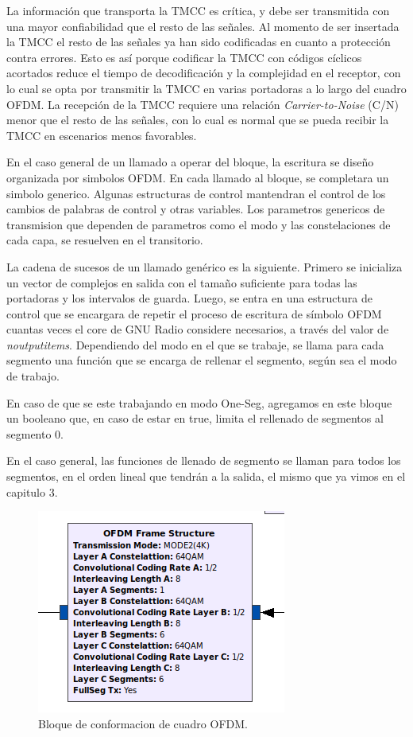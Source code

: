 La información que transporta la TMCC es crítica, y debe ser transmitida con una mayor confiabilidad que el resto de las señales. Al momento de ser insertada la TMCC el resto de las señales ya han sido codificadas en cuanto a protección contra errores. Esto es así porque codificar la TMCC con códigos cíclicos acortados reduce el tiempo de decodificación y la complejidad en el receptor, con lo cual se opta por transmitir la TMCC en varias portadoras a lo largo del cuadro OFDM. La recepción de la TMCC requiere una relación \textit{Carrier-to-Noise} (C/N) menor que el resto de las señales, con lo cual es normal que se pueda recibir la TMCC en escenarios menos favorables.

En el caso general de un llamado a operar del bloque, la escritura se diseño organizada por simbolos OFDM. En cada llamado al bloque, se completara un simbolo generico. Algunas estructuras de control mantendran el control de los cambios de palabras de control y otras variables. Los parametros genericos de transmision que dependen de parametros como el modo y las constelaciones de cada capa, se resuelven en el transitorio.

La cadena de sucesos de un llamado genérico es la siguiente. Primero se inicializa un vector de complejos en salida con el tamaño suficiente para todas las portadoras y los intervalos de guarda. Luego, se entra en una estructura de control que se encargara de  repetir el proceso de escritura de símbolo OFDM cuantas veces el core de GNU Radio considere necesarios, a través del valor de \textit{noutputitems}. Dependiendo del modo en el que se trabaje, se llama para cada segmento una función que se encarga de rellenar el segmento, según sea el modo de trabajo.

En caso de que se este trabajando en modo One-Seg, agregamos en este bloque un booleano que, en caso de estar en true, limita el rellenado de segmentos al segmento 0. 

En el caso general, las funciones de llenado de segmento se llaman para todos los segmentos, en el orden lineal que tendrán a la salida, el mismo que ya vimos en el capitulo 3.

\begin{figure}[h!]
	\centering
	\includegraphics[scale=0.5]{figuras/cap05/bloque_ofdm}
	\caption{\label{f:bloque_ofdm} Bloque de conformacion de cuadro OFDM.}
\end{figure}

